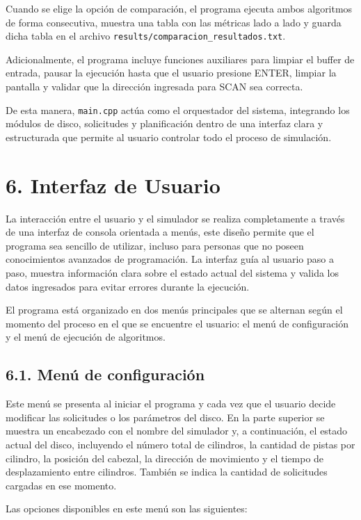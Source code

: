 \documentclass[14pt,letterpaper]{extarticle}
\begin{document}
Cuando se elige la opción de comparación, el programa ejecuta ambos algoritmos de forma consecutiva, muestra una tabla con las métricas lado a lado y guarda dicha tabla en el archivo \texttt{results/comparacion\_resultados.txt}.

Adicionalmente, el programa incluye funciones auxiliares para limpiar el buffer de entrada, pausar la ejecución hasta que el usuario presione ENTER, limpiar la pantalla y validar que la dirección ingresada para SCAN sea correcta.

De esta manera, \texttt{main.cpp} actúa como el orquestador del sistema, integrando los módulos de disco, solicitudes y planificación dentro de una interfaz clara y estructurada que permite al usuario controlar todo el proceso de simulación.

\section*{6. Interfaz de Usuario}

La interacción entre el usuario y el simulador se realiza completamente a través de una interfaz de consola orientada a menús, este diseño permite que el programa sea sencillo de utilizar, incluso para personas que no poseen conocimientos avanzados de programación. La interfaz guía al usuario paso a paso, muestra información clara sobre el estado actual del sistema y valida los datos ingresados para evitar errores durante la ejecución.

El programa está organizado en dos menús principales que se alternan según el momento del proceso en el que se encuentre el usuario: el menú de configuración y el menú de ejecución de algoritmos.

\subsection*{6.1. Menú de configuración}

Este menú se presenta al iniciar el programa y cada vez que el usuario decide modificar las solicitudes o los parámetros del disco. En la parte superior se muestra un encabezado con el nombre del simulador y, a continuación, el estado actual del disco, incluyendo el número total de cilindros, la cantidad de pistas por cilindro, la posición del cabezal, la dirección de movimiento y el tiempo de desplazamiento entre cilindros. También se indica la cantidad de solicitudes cargadas en ese momento.

Las opciones disponibles en este menú son las siguientes:
\end{document}
